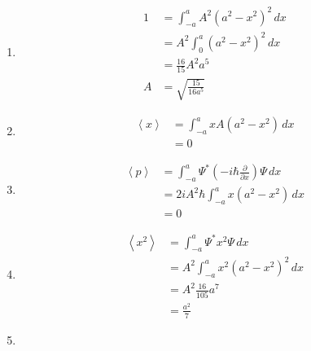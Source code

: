 \documentclass{article}
\newcommand{\ev}[1]{\left< #1 \right>}
\begin{document}
\begin{enumerate}
  \item

        \begin{align*}
          1 & = \int_{-a}^a A^2 (a^2 - x^2)^2 \,d x \\
            & = A^2 \int_0^a (a^2 - x^2)^2 \,d x    \\
            & = \frac{16}{15} A^2 a^5               \\
          A & = \sqrt{\frac{15}{16 a^5}}
        \end{align*}

  \item

        \begin{align*}
          \ev{x} & = \int_{-a}^a x A (a^2 - x^2) \,d x \\
                 & = 0
        \end{align*}

  \item

        \begin{align*}
          \ev{p} & = \int_{-a}^a \Psi^* \left( -i \hbar \frac{\partial}{\partial x} \right) \Psi \,d x \\
                 & = 2 i A^2 \hbar \int_{-a}^a x (a^2 - x^2) \,d x                                     \\
                 & = 0
        \end{align*}

  \item

        \begin{align*}
          \ev{x^2} & = \int_{-a}^a \Psi^* x^2 \Psi \,d x       \\
                   & = A^2 \int_{-a}^a x^2 (a^2 - x^2)^2 \,d x \\
                   & = A^2 \frac{16}{105} a^7                  \\
                   & = \frac{a^2}{7}
        \end{align*}

  \item


\end{enumerate}
\end{document}
